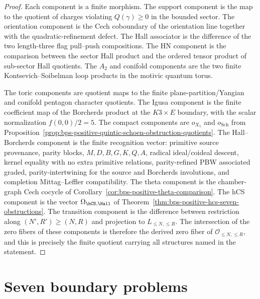 \begin{proof}
Each component is a finite morphism. The support component is the map
to the quotient of charges violating \(Q(\gamma)\geq0\) in the bounded
sector. The orientation component is the Cech coboundary of the
orientation line together with the quadratic-refinement defect. The
Hall associator is the difference of the two length-three flag
pull--push compositions. The HN component is the comparison between the
sector Hall product and the ordered tensor product of sub-sector Hall
quotients. The \(A_2\) and conifold components are the two finite
Kontsevich--Soibelman loop products in the motivic quantum torus.

The toric components are quotient maps to the finite
plane-partition/Yangian and conifold pentagon character quotients. The
Igusa component is the finite coefficient map of the Borcherds product
at the \(K3\times E\) boundary, with the scalar normalization
\(f(0,0)/2=5\). The compact components are \(o_{X_5}\) and
\(o_{\mathrm{Sch}}\) from
Proposition~\ref{prop:bps-positive-quintic-schoen-obstruction-quotients}.
The Hall--Borcherds component is the finite recognition vector:
primitive source provenance, parity blocks, \(M,D,B,G,K,Q,A\), radical
ideal/coideal descent, kernel equality with no extra primitive
relations, parity-refined PBW associated graded, parity-intertwining
for the source and Borcherds involutions, and completion
Mittag--Leffler compatibility. The theta component is the chamber-graph
Cech cocycle of
Corollary~\ref{cor:bps-positive-theta-comparison}. The hCS component is
the vector \(\Omega_{\hCS,\Hall}\) of
Theorem~\ref{thm:bps-positive-hcs-seven-obstructions}. The transition
component is the difference between restriction along
\((N',R')\geq(N,R)\) and projection to \(L_{\leq N,\leq R}\). The
intersection of the zero fibers of these components is therefore the
derived zero fiber of \(\mathcal O_{\leq N,\leq R}\), and this is
precisely the finite quotient carrying all structures named in the
statement.
\end{proof}

\section{Seven boundary problems}

